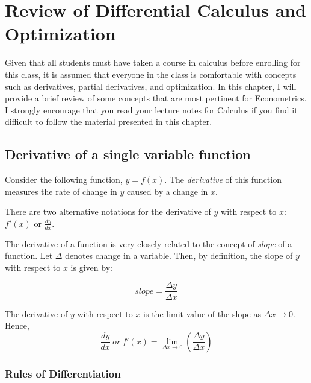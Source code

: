\documentclass[]{book}
\theoremstyle{definition}
\theoremstyle{definition}
\theoremstyle{definition}
\theoremstyle{remark}
\let\BeginKnitrBlock\begin \let\EndKnitrBlock\end
\begin{document}
\hypertarget{appendix-appendix}{%
\appendix}


\hypertarget{review-of-differential-calculus-and-optimization}{%
\chapter{Review of Differential Calculus and Optimization}\label{review-of-differential-calculus-and-optimization}}

Given that all students must have taken a course in calculus before enrolling for this class, it is assumed that everyone in the class is comfortable with concepts such as derivatives, partial derivatives, and optimization. In this chapter, I will provide a brief review of some concepts that are most pertinent for Econometrics. I strongly encourage that you read your lecture notes for Calculus if you find it difficult to follow the material presented in this chapter.

\hypertarget{derivative-of-a-single-variable-function}{%
\section{Derivative of a single variable function}\label{derivative-of-a-single-variable-function}}

\BeginKnitrBlock{definition}[Derivative of a function]
\protect\hypertarget{def:unnamed-chunk-13}{}{\label{def:unnamed-chunk-13} {} }Consider the following function, \(y=f(x)\). The \emph{derivative} of this function measures the rate of change in \(y\) caused by a change in \(x\).
\EndKnitrBlock{definition}

There are two alternative notations for the derivative of \(y\) with respect to \(x\): \(f'(x)\) or \(\displaystyle{\frac{dy}{dx}}\).

The derivative of a function is very closely related to the concept of \emph{slope} of a function. Let \(\Delta\) denotes change in a variable. Then, by definition, the slope of \(y\) with respect to \(x\) is given by:

\[slope=\frac{\Delta y}{\Delta x}\]

The derivative of \(y\) with respect to \(x\) is the limit value of the slope as \(\Delta x \rightarrow 0\). Hence,
\[\frac{dy}{dx} \ or \ f'(x)=\lim_{\Delta x \to 0} \left( \frac{\Delta y}{\Delta x}\right) \]

\hypertarget{rules-of-differentiation}{%
\subsection{Rules of Differentiation}\label{rules-of-differentiation}}
\end{document}
